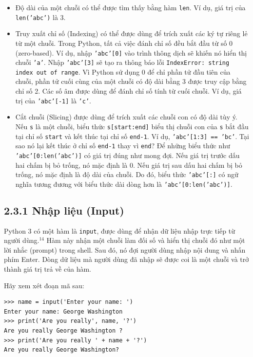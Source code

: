 \begin{itemize}
    \item Độ dài của một chuỗi có thể được tìm thấy bằng hàm \texttt{len}. Ví dụ, giá trị của \texttt{len('abc')} là 3.
    
    \item Truy xuất chỉ số (Indexing) có thể được dùng để trích xuất các ký tự riêng lẻ từ một chuỗi. Trong Python, tất cả việc đánh chỉ số đều bắt đầu từ số 0 (zero-based). Ví dụ, nhập \texttt{'abc'[0]} vào trình thông dịch sẽ khiến nó hiển thị chuỗi \texttt{'a'}. Nhập \texttt{'abc'[3]} sẽ tạo ra thông báo lỗi \texttt{IndexError: string index out of range}. Vì Python sử dụng 0 để chỉ phần tử đầu tiên của chuỗi, phần tử cuối cùng của một chuỗi có độ dài bằng 3 được truy cập bằng chỉ số 2. Các số âm được dùng để đánh chỉ số tính từ cuối chuỗi. Ví dụ, giá trị của \texttt{'abc'[-1]} là \texttt{'c'}.
    
    \item Cắt chuỗi (Slicing) được dùng để trích xuất các chuỗi con có độ dài tùy ý. Nếu \texttt{s} là một chuỗi, biểu thức \texttt{s[start:end]} biểu thị chuỗi con của \texttt{s} bắt đầu tại chỉ số \texttt{start} và kết thúc tại chỉ số \texttt{end-1}. Ví dụ, \texttt{'abc'[1:3] == 'bc'}. Tại sao nó lại kết thúc ở chỉ số \texttt{end-1} thay vì \texttt{end}? Để những biểu thức như \texttt{'abc'[0:len('abc')]} có giá trị đúng như mong đợi. Nếu giá trị trước dấu hai chấm bị bỏ trống, nó mặc định là 0. Nếu giá trị sau dấu hai chấm bị bỏ trống, nó mặc định là độ dài của chuỗi. Do đó, biểu thức \texttt{'abc'[:]} có ngữ nghĩa tương đương với biểu thức dài dòng hơn là \texttt{'abc'[0:len('abc')]}.
\end{itemize}

\subsection*{2.3.1 Nhập liệu (Input)}

\noindent \indent Python 3 có một hàm là \texttt{input}, được dùng để nhận dữ liệu nhập trực tiếp từ người dùng.$^{14}$ Hàm này nhận một chuỗi làm đối số và hiển thị chuỗi đó như một lời nhắc (prompt) trong shell. Sau đó, nó đợi người dùng nhập nội dung và nhấn phím Enter. Dòng dữ liệu mà người dùng đã nhập sẽ được coi là một chuỗi và trở thành giá trị trả về của hàm.

Hãy xem xét đoạn mã sau:

\begin{verbatim}
>>> name = input('Enter your name: ') 
Enter your name: George Washington 
>>> print('Are you really', name, '?') 
Are you really George Washington ? 
>>> print('Are you really ' + name + '?')  
Are you really George Washington?
\end{verbatim}


